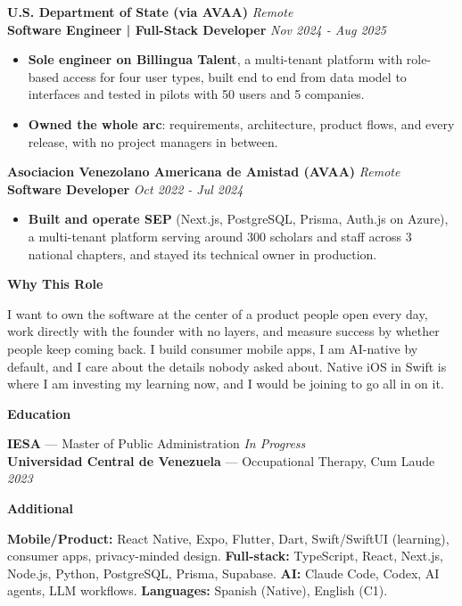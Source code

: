 \documentclass[10pt]{article}
\newcommand{\sectiontitle}[1]{%
    \vspace{5pt}
    \begin{center}
        \textbf{#1}
    \end{center}
    \vspace{-6pt}
}
\begin{document}
\vspace{4pt}
\textbf{U.S. Department of State (via AVAA)} \hfill \textit{Remote} \\
\textbf{Software Engineer | Full-Stack Developer} \hfill \textit{Nov 2024 - Aug 2025}
\begin{itemize}
    \item \textbf{Sole engineer on Billingua Talent}, a multi-tenant platform with role-based access for four user types, built end to end from data model to interfaces and tested in pilots with 50 users and 5 companies.
    \item \textbf{Owned the whole arc}: requirements, architecture, product flows, and every release, with no project managers in between.
\end{itemize}

\vspace{4pt}
\textbf{Asociacion Venezolano Americana de Amistad (AVAA)} \hfill \textit{Remote} \\
\textbf{Software Developer} \hfill \textit{Oct 2022 - Jul 2024}
\begin{itemize}
    \item \textbf{Built and operate SEP} (Next.js, PostgreSQL, Prisma, Auth.js on Azure), a multi-tenant platform serving around 300 scholars and staff across 3 national chapters, and stayed its technical owner in production.
\end{itemize}

\sectiontitle{Why This Role}
I want to own the software at the center of a product people open every day, work directly with the founder with no layers, and measure success by whether people keep coming back. I build consumer mobile apps, I am AI-native by default, and I care about the details nobody asked about. Native iOS in Swift is where I am investing my learning now, and I would be joining to go all in on it.

\sectiontitle{Education}
\textbf{IESA} — Master of Public Administration \hfill \textit{In Progress} \\
\textbf{Universidad Central de Venezuela} — Occupational Therapy, Cum Laude \hfill \textit{2023}

\sectiontitle{Additional}
\textbf{Mobile/Product:} React Native, Expo, Flutter, Dart, Swift/SwiftUI (learning), consumer apps, privacy-minded design. \textbf{Full-stack:} TypeScript, React, Next.js, Node.js, Python, PostgreSQL, Prisma, Supabase. \textbf{AI:} Claude Code, Codex, AI agents, LLM workflows. \textbf{Languages:} Spanish (Native), English (C1).
\end{document}
